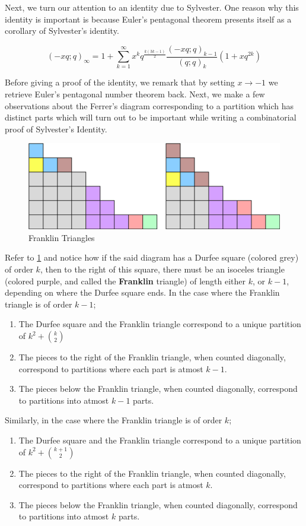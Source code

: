 Next, we turn our attention to an identity due to Sylvester. One reason why this identity is important is because Euler's pentagonal theorem presents itself as a corollary of Sylvester's identity. 
\begin{theorem}
\[
		\left( -xq;q \right)_{\infty} = 1+\sum_{k=1}^{\infty}x^kq^{\frac{k\left( 3k-1 \right) }{2}}\frac{\left( -xq;q \right)_{k-1}}{\left( q;q \right)_{k}}\left( 1+xq^{2k}\right)  
\]
\end{theorem}
Before giving a proof of the identity, we remark that by setting 
$x\to -1$ we retrieve Euler's pentagonal number theorem back. Next, we make a few observations about the Ferrer's diagram corresponding to a partition which has distinct parts which will turn out to be important while writing a combinatorial proof of Sylvester's Identity.   
\begin{figure}
    \centering
    \includegraphics[width=0.8\linewidth]{Images/Figure26.png}
    \caption{Franklin Triangles}
    \label{f:FranklinTsF}
\end{figure}
Refer to \cref{f:FranklinTsF} and notice how if the said diagram has a Durfee square (colored grey) of order $k$, then to the right of this square, there must be an isoceles triangle (colored purple, and called the \textbf{Franklin} triangle) of length either $k$, or $k-1$, depending on where the Durfee square ends. In the case where the Franklin triangle is of order $k-1$;   
\begin{enumerate}
			\item The Durfee square and the Franklin triangle correspond to a unique partition of $k^2+\binom{k}{2}$
			\item The pieces to the right of the Franklin triangle, when counted diagonally, correspond to partitions where each part is atmost $k-1$.
			\item The pieces below the Franklin triangle, when counted diagonally, correspond to partitions into atmost $k-1$ parts.
\end{enumerate}
Similarly, in the case where the Franklin triangle is of order $k$;
\begin{enumerate}
			 \item The Durfee square and the Franklin triangle correspond to a unique partition of $k^2+\binom{k+1}{2}$
			 \item The pieces to the right of the Franklin triangle, when counted diagonally, correspond to partitions where each part is atmost $k$.
			 \item The pieces below the Franklin triangle, when counted diagonally, correspond to partitions into atmost $k$ parts.
		\end{enumerate}
